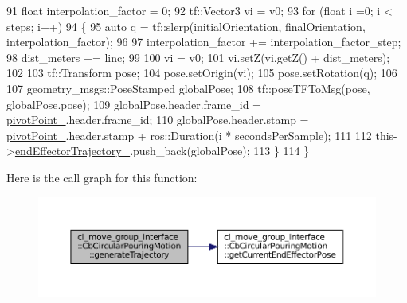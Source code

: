 \begin{DoxyCode}
91         \textcolor{keywordtype}{float} interpolation\_factor = 0;
92         tf::Vector3 vi = v0;
93         \textcolor{keywordflow}{for} (\textcolor{keywordtype}{float} i =0; i < steps; i++)
94         \{
95             \textcolor{keyword}{auto} q = tf::slerp(initialOrientation, finalOrientation, interpolation\_factor);
96 
97             interpolation\_factor += interpolation\_factor\_step;
98             dist\_meters += linc;
99 
100             vi = v0;
101             vi.setZ(vi.getZ() + dist\_meters);
102 
103             tf::Transform pose;
104             pose.setOrigin(vi);
105             pose.setRotation(q);
106 
107             geometry\_msgs::PoseStamped globalPose;
108             tf::poseTFToMsg(pose, globalPose.pose);
109             globalPose.header.frame\_id = \hyperlink{classcl__move__group__interface_1_1CbCircularPouringMotion_a4c100d8ba3e57f7ddfb614017d115fca}{pivotPoint\_}.header.frame\_id;
110             globalPose.header.stamp = \hyperlink{classcl__move__group__interface_1_1CbCircularPouringMotion_a4c100d8ba3e57f7ddfb614017d115fca}{pivotPoint\_}.header.stamp + ros::Duration(i * 
      secondsPerSample);
111 
112             this->\hyperlink{classcl__move__group__interface_1_1CbMoveEndEffectorTrajectory_ae13dfd31ea3660646e03882f0c2c29f0}{endEffectorTrajectory\_}.push\_back(globalPose);
113         \}
114     \}
\end{DoxyCode}
Here is the call graph for this function\+:
\nopagebreak
\begin{figure}[H]
\begin{center}
\leavevmode
\includegraphics[width=350pt]{classcl__move__group__interface_1_1CbCircularPouringMotion_a9150bb3731082aad3af2d7d6e067a344_cgraph}
\end{center}
\end{figure}
\mbox{\label{classcl__move__group__interface_1_1CbCircularPouringMotion_a0cc72cc5233ecb0c264621d4d9501b30}} 
